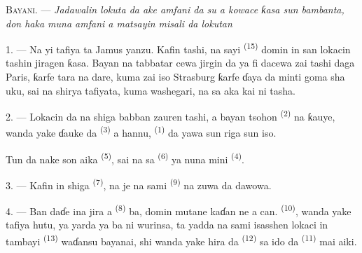 %

\VUsaut{4.0mm}
\VUsaut{2.4mm}
\VUsaut{3.4mm}
\textsc{Bayani.} --- \textit{Jadawalin lokuta da ake amfani da su a
kowace ƙasa sun bambanta, don haka muna amfani a matsayin misali da
lokutan} 

1. --- Na yi tafiya ta Jamus yanzu. Kafin tashi, na sayi
 \textsuperscript{(15)} domin in san lokacin
tashin jiragen ƙasa. Bayan na tabbatar cewa jirgin da ya fi dacewa zai
tashi daga Paris, ƙarfe tara na dare, kuma zai iso Strasburg ƙarfe ɗaya
da minti goma sha uku, sai na shirya tafiyata, kuma washegari, na sa
aka kai ni tasha.

2. --- Lokacin da na shiga babban zauren tashi, a bayan tsohon
 \textsuperscript{(2)} na ƙauye, wanda yake ɗauke da
 \textsuperscript{(3)} a hannu, 
\textsuperscript{(1)} da yawa sun riga sun iso.

Tun da nake son aika  \textsuperscript{(5)}, sai na sa
 \textsuperscript{(6)} ya nuna mini 
\textsuperscript{(4)}.

3. --- Kafin in shiga  \textsuperscript{(7)}, na je na
sami  \textsuperscript{(9)} na zuwa da dawowa.

4. --- Ban daɗe ina jira a  \textsuperscript{(8)} ba,
domin mutane kaɗan ne a can.  \textsuperscript{(10)}, wanda yake
tafiya hutu, ya yarda ya ba ni wurinsa, ta yadda na sami isasshen
lokaci in tambayi  \textsuperscript{(13)} waɗansu
bayanai, shi wanda yake hira da 
\textsuperscript{(12)} sa ido da  \textsuperscript{(11)} mai
aiki.

